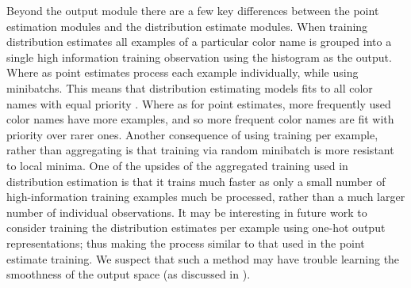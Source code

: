 \documentclass[11pt,a4paper]{article}
\begin{document}
Beyond the output module there are a few key differences between the point estimation modules and the distribution estimate modules.
When training distribution estimates all examples of a particular color name is grouped into a single high information training observation using the histogram as the output.
Where as point estimates process each example individually, while using minibatchs.
This means that distribution estimating models fits to all color names with equal priority .
Where as for point estimates, more frequently used color names have more examples, and so more frequent color names are fit with priority over rarer ones.
Another consequence of using training per example, rather than aggregating is that training via random minibatch is more resistant to local minima.
One of the upsides of the aggregated training used in distribution estimation is that it trains much faster as only a small number of high-information training examples much be processed, rather than a much larger number of individual observations.
It may be interesting in future work to consider training the distribution estimates per example using one-hot output representations; thus making the process similar to that used in the point estimate training.
We suspect that such a method may have trouble learning the smoothness of the output space (as discussed in ).






\end{document}
